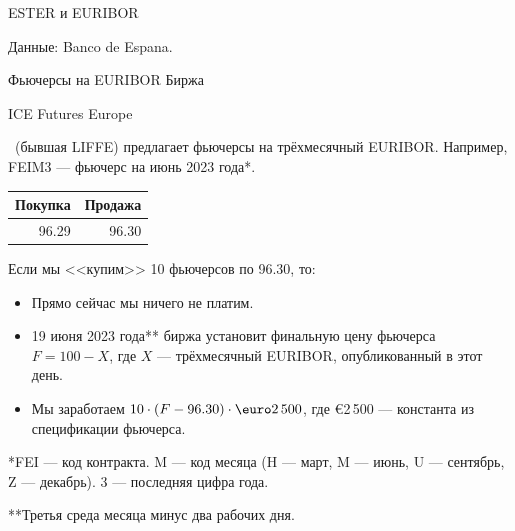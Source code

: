 \documentclass{beamer}
\renewcommand{\EUR}[1]{\textup{\euro}#1}
\newcommand{\en}[1]{\begin{otherlanguage}{english}#1\end{otherlanguage}}
\begin{document}
\newcommand{\plotBenchmarkRate}[2] {
	
	\addplot[
		color = #2,
		mark = none,
		thick
	]
	table[
		x=date,
		y=#1,
		col sep=comma
	]
	{euro_benchmark.csv};
}



\begin{frame}{ESTER и EURIBOR}
\centering
{}

\scriptsize Данные: Banco de Espana.
\end{frame}



\begin{frame}{Фьючерсы на EURIBOR}
\justify
Биржа \en{ICE Futures Europe}\ (бывшая LIFFE) предлагает фьючерсы на трёхмесячный EURIBOR. Например, \alert{FEIM3} --- фьючерс на июнь 2023 года*.

\justify
\centering
\begin{tabular}{r|r}
Покупка & Продажа \\ \hline
96.29 & 96.30
\end{tabular}

\justify
Если мы <<купим>> 10 фьючерсов по 96.30, то:
\begin{itemize}
\justifying
\item Прямо сейчас мы ничего не платим.
\item 19 июня 2023 года** биржа установит финальную цену фьючерса $F = 100 - X$, где 
$X$ --- трёхмесячный EURIBOR, опубликованный в этот день.
\item Мы заработаем $10 \cdot (F - 96.30) \cdot \EUR{2\,500}$, где \EUR{2\,500} --- 
константа из спецификации фьючерса.
\end{itemize}

\justify
*FEI --- код контракта. M --- код месяца (H --- март, M --- июнь, U --- сентябрь, Z --- 
декабрь). 3 --- последняя цифра года.

\justify
**Третья среда месяца минус два рабочих дня.
\end{frame}
\end{document}
